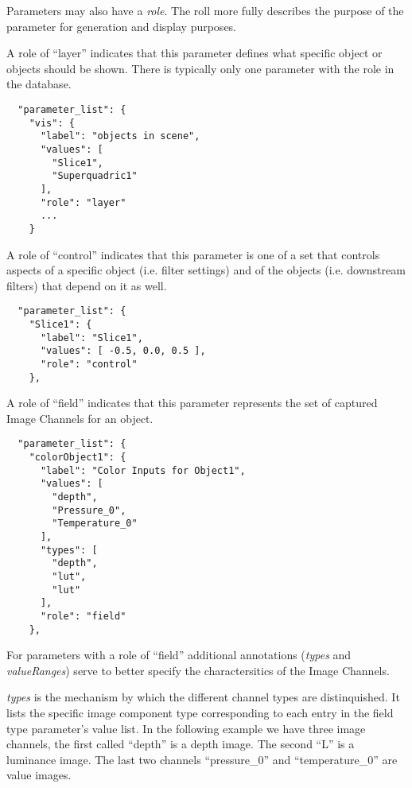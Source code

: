 
Parameters may also have a \textit{role}. The roll more fully describes the
purpose of the parameter for generation and display purposes.

A role of ``layer'' indicates that this parameter defines what specific object or objects
should be shown. There is typically only one parameter with the role
in the database.  

\begin{verbatim}
  "parameter_list": {
    "vis": {
      "label": "objects in scene",
      "values": [
        "Slice1",
        "Superquadric1"
      ],
      "role": "layer"
      ...
    }
\end{verbatim}

A role of ``control'' indicates that this parameter is one of
a set that controls aspects of a specific object (i.e. filter
settings) and of the objects (i.e. downstream filters) that depend on it as well.

\begin{verbatim}
  "parameter_list": {
    "Slice1": {
      "label": "Slice1",
      "values": [ -0.5, 0.0, 0.5 ],
      "role": "control"
    },
\end{verbatim}

A role of ``field'' indicates that this parameter represents the set
of captured Image Channels for an object.

\begin{verbatim}
  "parameter_list": {
    "colorObject1": {
      "label": "Color Inputs for Object1",
      "values": [
        "depth",
        "Pressure_0",
        "Temperature_0"
      ],
      "types": [
        "depth",
        "lut",
        "lut"
      ],
      "role": "field"
    },
\end{verbatim}

For parameters with a role of ``field'' additional annotations (\textit{types} and \textit{valueRanges}) serve
to better specify the charactersitics of the Image Channels.


\textit{types} is the mechanism by which the different channel types
are distinquished. It lists the specific image component type
corresponding to each entry in the field type parameter's value list. In the following
example we have three image channels, the first called ``depth'' is a
depth image. The second ``L'' is a luminance image. The last two channels
``pressure\_0'' and ``temperature\_0'' are value images.
 
